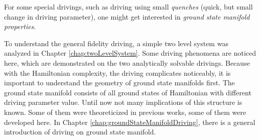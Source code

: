 For some special drivings, such as driving using small \emph{quenches} (quick, but small change in driving parameter), one might get interested in \emph{ground state manifold properties}.

To understand the general fidelity driving, a simple two level system was analyzed in Chapter \ref{chap:twoLevelSystem}. Some driving phenomena are noticed here, which are demonstrated on the two analytically solvable drivings. Because with the Hamiltonian complexity, the driving complicates noticeably, it is important to understand the geometry of ground state manifolds first. The ground state manifold consists of all ground states of Hamiltonian with different driving parameter value. Until now not many implications of this structure is known. Some of them were theoreticized in previous works, some of them were developed here. In Chapter \ref{chap:groundStateManifoldDriving}, there is a general introduction of driving on ground state manifold. 




